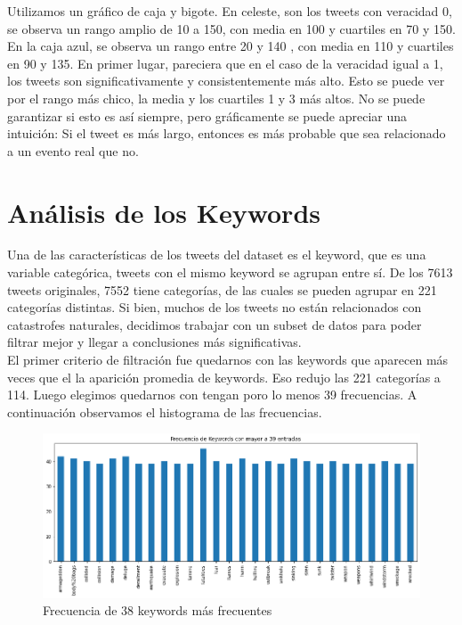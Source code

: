 \documentclass[]{article}
\begin{document}
Utilizamos un gr\'afico de caja y bigote. En celeste, son los tweets con veracidad 0, se observa un rango amplio de 10 a 150, con media en 100 y cuartiles en 70 y 150. En la caja azul, se observa un rango entre 20 y 140 , con media en 110 y cuartiles en 90 y 135. En primer lugar, pareciera que en el caso de la veracidad igual a 1, los tweets son significativamente y consistentemente m\'as alto. Esto se puede ver por el rango m\'as chico, la media y los cuartiles 1 y 3 m\'as altos. No se puede garantizar si esto es as\'i siempre, pero gr\'aficamente se puede apreciar una intuici\'on: Si el tweet es m\'as largo, entonces es m\'as probable que sea relacionado a un evento real que no. 

\section{An\'alisis de los Keywords}
Una de las caracter\'isticas de los tweets del dataset es el keyword, que es una variable categ\'orica, tweets con el mismo keyword se agrupan entre s\'i. De los 7613 tweets originales, 7552 tiene categor\'ias, de las cuales se pueden agrupar en 221 categor\'ias distintas. Si bien, muchos de los tweets no est\'an relacionados con catastrofes naturales, decidimos trabajar con un subset de datos para poder filtrar mejor y llegar a conclusiones m\'as significativas. \\

El primer criterio de filtraci\'on fue quedarnos con las keywords que aparecen m\'as veces que el la aparici\'on promedia de keywords. Eso redujo las 221 categor\'ias a 114. Luego elegimos quedarnos con tengan poro lo menos 39 frecuencias. A continuaci\'on observamos el histograma de las frecuencias. \\

 \begin{figure}[H]

	\includegraphics[width=1.20\linewidth]{keyword}
	\caption[]{Frecuencia de 38 keywords m\'as frecuentes}
\end{figure}
\end{document}
